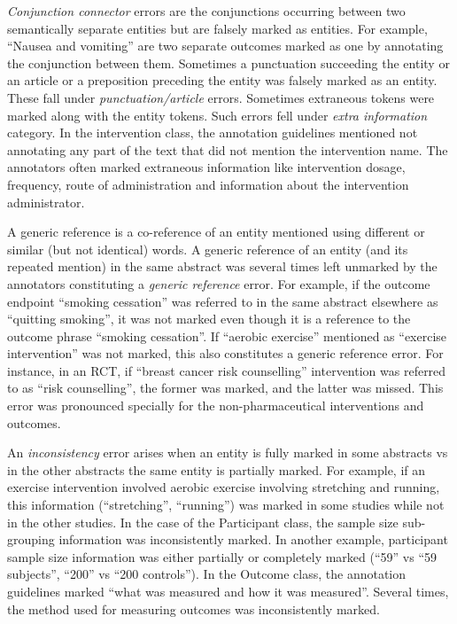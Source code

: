\documentclass[10.7pt,]{article}
\begin{document}
\textit{Conjunction connector} errors are the conjunctions occurring between two semantically separate entities but are falsely marked as entities.
For example, ``Nausea and vomiting'' are two separate outcomes marked as one by annotating the conjunction between them.
Sometimes a punctuation succeeding the entity or an article or a preposition preceding the entity was falsely marked as an entity. These fall under \textit{punctuation/article} errors.
Sometimes extraneous tokens were marked along with the entity tokens. 
Such errors fell under \textit{extra information} category.
In the intervention class, the annotation guidelines mentioned not annotating any part of the text that did not mention the intervention name.
The annotators often marked extraneous information like intervention dosage, frequency, route of administration and information about the intervention administrator.


A generic reference is a co-reference of an entity mentioned using different or similar (but not identical) words. 
A generic reference of an entity (and its repeated mention) in the same abstract was several times left unmarked by the annotators constituting a \textit{generic reference} error.
For example, if the outcome endpoint ``smoking cessation'' was referred to in the same abstract elsewhere as ``quitting smoking'', it was not marked even though it is a reference to the outcome phrase ``smoking cessation''.
If ``aerobic exercise'' mentioned as ``exercise intervention'' was not marked, this also constitutes a generic reference error.
For instance, in an RCT, if ``breast cancer risk counselling'' intervention was referred to as ``risk counselling'', the former was marked, and the latter was missed.
This error was pronounced specially for the non-pharmaceutical interventions and outcomes.

An \textit{inconsistency} error arises when an entity is fully marked in some abstracts vs in the other abstracts the same entity is partially marked. 
For example, if an exercise intervention involved aerobic exercise involving stretching and running, this information (``stretching'', ``running'') was marked in some studies while not in the other studies.
In the case of the Participant class, the sample size sub-grouping information was inconsistently marked.
In another example, participant sample size information was either partially or completely marked (``59'' vs ``59 subjects'', ``200'' vs ``200 controls'').
In the Outcome class, the annotation guidelines marked ``what was measured and how it was measured''. 
Several times, the method used for measuring outcomes was inconsistently marked.
\end{document}

